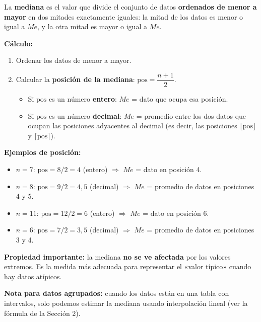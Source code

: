 \documentclass[11pt, letterpaper]{article}
\begin{document}
\begin{tcolorbox}[importantbox, title={Mediana $Me$}]
La \textbf{mediana} es el valor que divide el conjunto de datos \textbf{ordenados de menor a mayor} en dos mitades exactamente iguales: la mitad de los datos es menor o igual a $Me$, y la otra mitad es mayor o igual a $Me$.

\medskip
\textbf{Cálculo:}
\begin{enumerate}[label=\arabic*.]
  \item Ordenar los datos de menor a mayor.
  \item Calcular la \textbf{posición de la mediana}: $\text{pos} = \dfrac{n+1}{2}$.
  \begin{itemize}
    \item Si $\text{pos}$ es un número \textbf{entero}: $Me$ = dato que ocupa esa posición.
    \item Si $\text{pos}$ es un número \textbf{decimal}: $Me$ = promedio entre los dos datos que ocupan las posiciones adyacentes al decimal (es decir, las posiciones $\lfloor\text{pos}\rfloor$ y $\lceil\text{pos}\rceil$).
  \end{itemize}
\end{enumerate}

\medskip
\textbf{Ejemplos de posición:}
\begin{itemize}
  \item $n=7$: $\text{pos} = 8/2 = 4$ (entero) $\Rightarrow$ $Me$ = dato en posición 4.
  \item $n=8$: $\text{pos} = 9/2 = 4{,}5$ (decimal) $\Rightarrow$ $Me$ = promedio de datos en posiciones 4 y 5.
  \item $n=11$: $\text{pos} = 12/2 = 6$ (entero) $\Rightarrow$ $Me$ = dato en posición 6.
  \item $n=6$: $\text{pos} = 7/2 = 3{,}5$ (decimal) $\Rightarrow$ $Me$ = promedio de datos en posiciones 3 y 4.
\end{itemize}

\medskip
\textbf{Propiedad importante:} la mediana \textbf{no se ve afectada} por los valores extremos. Es la medida más adecuada para representar el «valor típico» cuando hay datos atípicos.

\medskip
\textbf{Nota para datos agrupados:} cuando los datos están en una tabla con intervalos, solo podemos estimar la mediana usando interpolación lineal (ver la fórmula de la Sección 2).
\end{tcolorbox}
\end{document}
